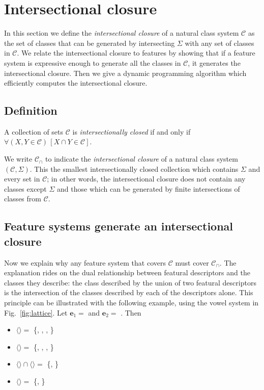 \documentclass[11pt, oneside]{article}   	%
\begin{document}
\section{Intersectional closure}

In this section we define the \textit{intersectional closure} of a natural class system $\mathcal C$ as the set of classes that can be generated by intersecting $\Sigma$ with any set of classes in $\mathcal C$. We relate the intersectional closure to features by showing that if a feature system is expressive enough to generate all the classes in $\mathcal C$, it generates the intersectional closure. Then we give a dynamic programming algorithm which efficiently computes the intersectional closure. 

\subsection{Definition}

A collection of sets $\mathcal C$ is \textit{intersectionally closed} if and only if $\forall (X, Y \in \mathcal C) \, [ X \cap Y \in \mathcal C]$.

We write $\mathcal C_\cap$ to indicate the \textit{intersectional closure} of a natural class system $(\mathcal C, \Sigma)$. This the smallest intersectionally closed collection which contains $\Sigma$ and every set in $\mathcal C$; in other words, the intersectional closure does not contain any classes except $\Sigma$ and those which can be generated by finite intersections of classes from $\mathcal C$.

\subsection{Feature systems generate an intersectional closure}

Now we explain why any feature system that covers $\mathcal C$ must cover $\mathcal C_\cap$. The explanation rides on the dual relationship between featural descriptors and the classes they describe: the class described by the union of two featural descriptors is the intersection of the classes described by each of the descriptors alone. This principle can be illustrated with the following example, using the vowel system in Fig.~\ref{fig:lattice}. Let $\mathbf{e}_1 =$  and $\mathbf{e}_2 =$ . Then \begin{itemize}
    \item $\langle$$\rangle =$ \{\textipa{\oe}, , , \}
    \item $\langle$$\rangle =$ \{\textipa{\oe}, , , \}
    \item $\langle$$\rangle \cap \langle$$\rangle =$ \{\textipa{\oe}, \}
    \item $\langle$$\rangle =$ \{\textipa{\oe}, \}
    \end{itemize}
\end{document}
